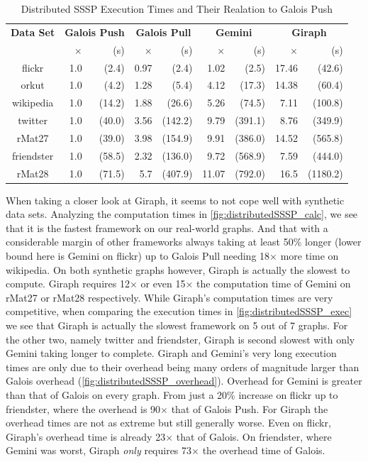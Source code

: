 \begin{table}
\renewcommand{\arraystretch}{1.2}
\tiny
\centering
\caption{Distributed SSSP Execution Times and Their Realation to Galois Push}
\begin{tabular}{crrrrrrrr}
\toprule
\bf{Data Set}&
\multicolumn{2}{c}{\bf Galois Push}&\multicolumn{2}{c}{\bf Galois Pull}&\multicolumn{2}{c}{\bf Gemini}&\multicolumn{2}{c}{\bf Giraph}\\
&$\times$&(s)&$\times$&(s)&$\times$&(s)&$\times$&(s)\\\midrule
flickr & 1.0 & (2.4) & 0.97 & (2.4) & 1.02 & (2.5) & 17.46 & (42.6)\\
orkut & 1.0 & (4.2) & 1.28 & (5.4) & 4.12 & (17.3) & 14.38 & (60.4)\\
wikipedia & 1.0 & (14.2) & 1.88 & (26.6) & 5.26 & (74.5) & 7.11 & (100.8) \\
twitter & 1.0 & (40.0) & 3.56 & (142.2) & 9.79 & (391.1) & 8.76 & (349.9)\\
rMat27 & 1.0 & (39.0) & 3.98 & (154.9) & 9.91 & (386.0) & 14.52 & (565.8)\\
friendster & 1.0 & (58.5) & 2.32 & (136.0) & 9.72 & (568.9) & 7.59 & (444.0)\\
rMat28 & 1.0 & (71.5) & 5.7 & (407.9) & 11.07 & (792.0) & 16.5 & (1180.2)\\\bottomrule
\end{tabular}
\label{tbl:ssspexec}
\end{table}

When taking a closer look at Giraph, it seems to not cope well with synthetic data sets. Analyzing the computation times in \autoref{fig:distributedSSSP_calc}, we see that it is the fastest framework on our real-world graphs. And that with a considerable margin of other frameworks always taking at least 50\% longer (lower bound here is Gemini on flickr) up to Galois Pull needing 18$\times$ more time on wikipedia.
On both synthetic graphs however, Giraph is actually the slowest to compute. Giraph requires 12$\times$ or even 15$\times$ the computation time of Gemini on rMat27 or rMat28 respectively.
While Giraph's computation times are very competitive, when comparing the execution times in \autoref{fig:distributedSSSP_exec} we see that Giraph is actually the slowest framework on 5 out of 7 graphs. For the other two, namely twitter and friendster, Giraph is second slowest with only Gemini taking longer to complete.
Giraph and Gemini's very long execution times are only due to their overhead being many orders of magnitude larger than Galois overhead (\autoref{fig:distributedSSSP_overhead}).
Overhead for Gemini is greater than that of Galois on every graph. From just a 20\% increase on flickr up to friendster, where the overhead is 90$\times$ that of Galois Push.
For Giraph the overhead times are not as extreme but still generally worse. Even on flickr, Giraph's overhead time is already 23$\times$ that of Galois. On friendster, where Gemini was worst, Giraph \emph{only} requires 73$\times$ the overhead time of Galois.

